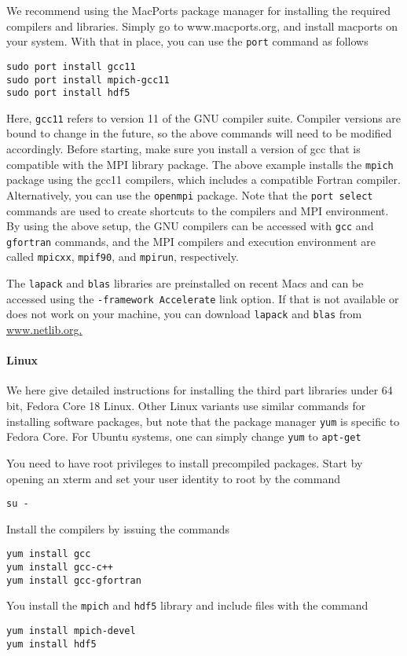 \documentclass[11pt]{article}
\begin{document}
We recommend using the MacPorts package manager for installing the required compilers and libraries. Simply go to www.macports.org, and install macports on your system. With that in place, you can use the \verb+port+ command as follows
\begin{verbatim}
sudo port install gcc11
sudo port install mpich-gcc11
sudo port install hdf5
\end{verbatim}
Here, \verb+gcc11+ refers to version 11 of the GNU compiler suite. Compiler versions are bound to change in the future, so the above commands will need to be modified accordingly. Before starting, make sure you install a version of gcc that is compatible with the MPI library package. The above example installs the \verb+mpich+ package using the gcc11 compilers, which includes a compatible Fortran compiler. Alternatively, you can use the \verb+openmpi+ package. Note that the \verb+port select+ commands are used to create shortcuts to the compilers and MPI environment. By using the above setup, the GNU compilers can be accessed with \verb+gcc+ and \verb+gfortran+ commands, and the MPI compilers and execution environment are called \verb+mpicxx+, \verb+mpif90+, and \verb+mpirun+, respectively.

The \verb+lapack+ and \verb+blas+ libraries are preinstalled on recent Macs and can be accessed using the \verb+-framework Accelerate+ link option. If that is not available or does not work on your machine, you can download \verb+lapack+ and \verb+blas+ from \url{www.netlib.org.}

\paragraph{Linux}
We here give detailed instructions for installing the third part libraries under 64 bit, Fedora Core 18 Linux. Other Linux variants use similar commands for installing software packages, but note that the package manager \verb+yum+ is specific to Fedora Core. For Ubuntu systems, one can simply change \verb+yum+ to \verb+apt-get+

You need to have root privileges to install precompiled packages. Start by opening an xterm and set your user identity to root by the command
\begin{verbatim}
su -
\end{verbatim}
Install the compilers by issuing the commands
\begin{verbatim}
yum install gcc
yum install gcc-c++
yum install gcc-gfortran
\end{verbatim}
You install the \verb+mpich+ and \verb+hdf5+ library and include files with the command
\begin{verbatim}
yum install mpich-devel
yum install hdf5
\end{verbatim}
\end{document}
